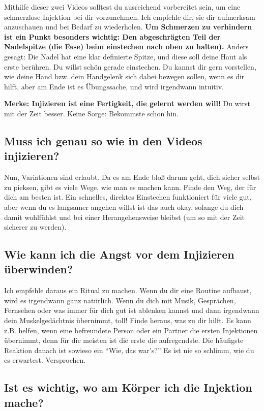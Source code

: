 \documentclass{article}
\begin{document}
Mithilfe dieser zwei Videos solltest du ausreichend vorbereitet sein, um eine schmerzlose Injektion bei dir vorzunehmen. Ich empfehle dir, sie dir aufmerksam anzuschauen und bei Bedarf zu wiederholen. \textbf{Um Schmerzen zu verhindern ist ein Punkt besonders wichtig: Den abgeschrägten Teil der Nadelspitze (die Fase) beim einstechen nach oben zu halten).} Anders gesagt: Die Nadel hat eine klar definierte Spitze, und diese soll deine Haut als erste berühren. Du willst schön gerade einstechen. Du kannst dir gern vorstellen, wie deine Hand bzw. dein Handgelenk sich dabei bewegen sollen, wenn es dir hilft, aber am Ende ist es Übungssache, und wird irgendwann intuitiv.

\textbf{Merke: Injizieren ist eine Fertigkeit, die gelernt werden will!} Du wirst mit der Zeit besser. Keine Sorge: Bekommste schon hin.

\subsection{Muss ich genau so wie in den Videos injizieren?}

Nun, Variationen sind erlaubt. Da es am Ende bloß darum geht, dich sicher selbst zu pieksen, gibt es viele Wege, wie man es machen kann. Finde den Weg, der für dich am besten ist. Ein schnelles, direktes Einstechen funktioniert für viele gut, aber wenn du es langsamer angehen willst ist das auch okay, solange du dich damit wohlfühlst und bei einer Herangehensweise bleibst (um so mit der Zeit sicherer zu werden).

\subsection{Wie kann ich die Angst vor dem Injizieren überwinden?}

Ich empfehle daraus ein Ritual zu machen. Wenn du dir eine Routine aufbaust, wird es irgendwann ganz natürlich. Wenn du dich mit Musik, Gesprächen, Fernsehen oder was immer für dich gut ist ablenken kannst und dann irgendwann dein Muskelgedächtnis übernimmt, toll! Finde heraus, was zu dir hilft. Es kann z.B. helfen, wenn eine befreundete Person oder ein Partner die ersten Injektionen übernimmt, denn für die meisten ist die erste die aufregendste. Die häufigste Reaktion danach ist sowieso ein “Wie, das war's?” Es ist nie so schlimm, wie du es erwartest. Versprochen.

\subsection{Ist es wichtig, wo am Körper ich die Injektion mache?}
\end{document}
